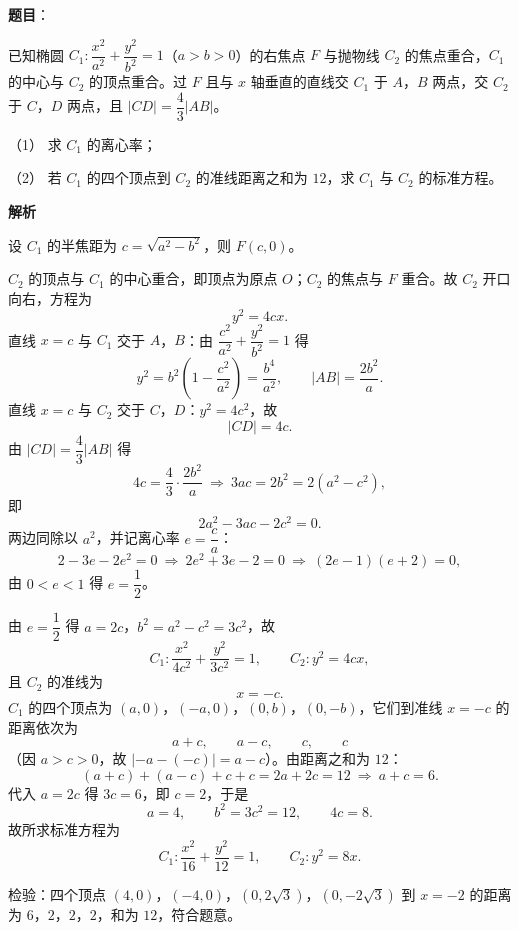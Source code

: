 \begin{answer}

\textbf{题目}：

已知椭圆 $C_1:\dfrac{x^2}{a^2}+\dfrac{y^2}{b^2}=1$（$a>b>0$）的右焦点 $F$ 与抛物线 $C_2$ 的焦点重合，$C_1$ 的中心与 $C_2$ 的顶点重合。过 $F$ 且与 $x$ 轴垂直的直线交 $C_1$ 于 $A$，$B$ 两点，交 $C_2$ 于 $C$，$D$ 两点，且 $|CD|=\dfrac43|AB|$。

（1） 求 $C_1$ 的离心率；

（2） 若 $C_1$ 的四个顶点到 $C_2$ 的准线距离之和为 $12$，求 $C_1$ 与 $C_2$ 的标准方程。

\textbf{解析}


设 $C_1$ 的半焦距为 $c=\sqrt{a^2-b^2}$，则 $F(c,0)$。

$C_2$ 的顶点与 $C_1$ 的中心重合，即顶点为原点 $O$；$C_2$ 的焦点与 $F$ 重合。故 $C_2$ 开口向右，方程为
\nopagebreak[4]
\[y^2=4cx .\]
直线 $x=c$ 与 $C_1$ 交于 $A$，$B$：由 $\dfrac{c^2}{a^2}+\dfrac{y^2}{b^2}=1$ 得
\nopagebreak[4]
\[y^2=b^2\left(1-\frac{c^2}{a^2}\right)=\frac{b^4}{a^2},\qquad |AB|=\frac{2b^2}{a} .\]
直线 $x=c$ 与 $C_2$ 交于 $C$，$D$：$y^2=4c^2$，故
\nopagebreak[4]
\[|CD|=4c .\]
由 $|CD|=\dfrac43|AB|$ 得
\nopagebreak[4]
\[4c=\frac43\cdot\frac{2b^2}{a}\ \Longrightarrow\ 3ac=2b^2=2(a^2-c^2),\]
即
\nopagebreak[4]
\[2a^2-3ac-2c^2=0 .\]
两边同除以 $a^2$，并记离心率 $e=\dfrac ca$：
\nopagebreak[4]
\[2-3e-2e^2=0\ \Longrightarrow\ 2e^2+3e-2=0\ \Longrightarrow\ (2e-1)(e+2)=0,\]
由 $0<e<1$ 得 $e=\dfrac12$。


由 $e=\dfrac12$ 得 $a=2c$，$b^2=a^2-c^2=3c^2$，故
\nopagebreak[4]
\[C_1:\frac{x^2}{4c^2}+\frac{y^2}{3c^2}=1,\qquad C_2:y^2=4cx,\]
且 $C_2$ 的准线为
\nopagebreak[4]
\[x=-c .\]
$C_1$ 的四个顶点为 $(a,0)$，$(-a,0)$，$(0,b)$，$(0,-b)$，它们到准线 $x=-c$ 的距离依次为
\nopagebreak[4]
\[a+c,\qquad a-c,\qquad c,\qquad c\]
（因 $a>c>0$，故 $|-a-(-c)|=a-c$）。由距离之和为 $12$：
\nopagebreak[4]
\[(a+c)+(a-c)+c+c=2a+2c=12\ \Longrightarrow\ a+c=6 .\]
代入 $a=2c$ 得 $3c=6$，即 $c=2$，于是
\nopagebreak[4]
\[a=4,\qquad b^2=3c^2=12,\qquad 4c=8 .\]
故所求标准方程为
\nopagebreak[4]
\[C_1:\frac{x^2}{16}+\frac{y^2}{12}=1,\qquad C_2:y^2=8x .\]

检验：四个顶点 $(4,0)$，$(-4,0)$，$(0,2\sqrt3)$，$(0,-2\sqrt3)$ 到 $x=-2$ 的距离为 $6$，$2$，$2$，$2$，和为 $12$，符合题意。



\end{answer}
